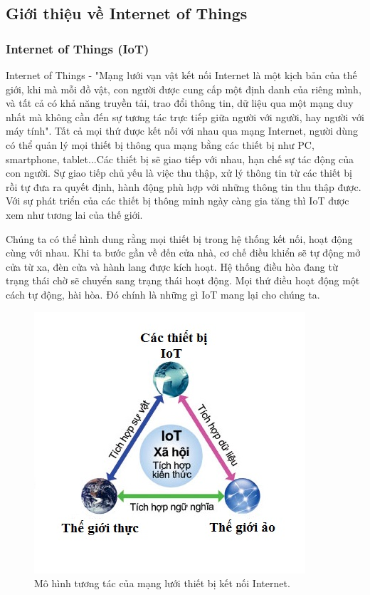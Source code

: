 \documentclass[a4paper,12pt,oneside]{article}
\begin{document}
\subsection{Giới thiệu về Internet of Things}

\subsubsection{Internet of Things (IoT)}

\noindent Internet of Things - "Mạng lưới vạn vật kết nối Internet là một kịch bản của thế giới, khi mà mỗi đồ vật, con người được cung cấp một định danh của riêng mình, và tất cả có khả năng truyền tải, trao đổi thông tin, dữ liệu qua một mạng duy nhất mà không cần đến sự tương tác trực tiếp giữa người với người, hay người với máy tính"\cite{iot}. Tất cả mọi thứ được kết nối với nhau qua mạng Internet, người dùng có thể quản lý mọi thiết bị thông qua mạng bằng các thiết bị như PC, smartphone, tablet...Các thiết bị sẽ giao tiếp với nhau, hạn chế sự tác động của con người. Sự giao tiếp chủ yếu là việc thu thập, xử lý thông tin từ các thiết bị rồi tự đưa ra quyết định, hành động phù hợp với những thông tin thu thập được. Với sự phát triển của các thiết bị thông minh ngày càng gia tăng thì IoT được xem như tương lai của thế giới.

\noindent Chúng ta có thể hình dung rằng mọi thiết bị trong hệ thống kết nối, hoạt động cùng với nhau. Khi ta bước gần về đến cửa nhà, cơ chế điều khiển sẽ tự động mở cửa từ xa, đèn cửa và hành lang được kích hoạt. Hệ thống điều hòa đang từ trạng thái chờ sẽ chuyển sang trạng thái hoạt động. Mọi thứ điều hoạt động một cách tự động, hài hòa. Đó chính là những gì IoT mang lại cho chúng ta.

\begin{figure}[H]
\centering
\includegraphics[scale=1]{hinh/IoT_intro.jpg}
\caption{Mô hình tương tác của mạng lưới thiết bị kết nối Internet\cite{iot}.}
\end{figure}
\end{document}
